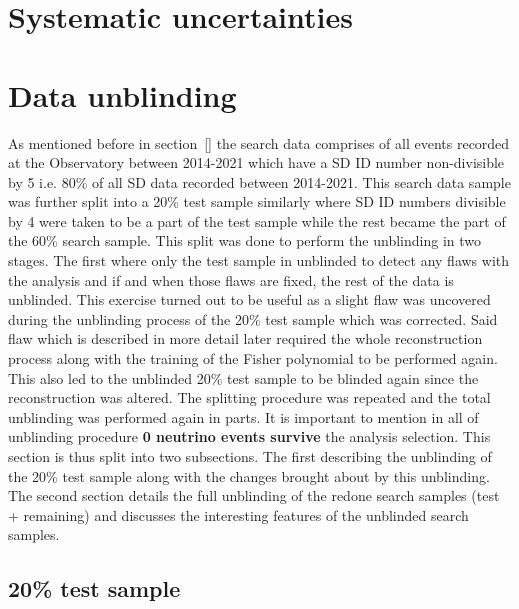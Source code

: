 \section{Systematic uncertainties}
\label{sec:det_uncert}

\section{Data unblinding}
\label{sec:data_unblinding}
As mentioned before in section~\ref{} the search data comprises of all events recorded at the Observatory between 2014-2021 which have a SD ID number non-divisible by 5 i.e. 80\% of all SD data recorded between 2014-2021. This search data sample was further split into a 20\% test sample similarly where SD ID numbers divisible by 4 were taken to be a part of the test sample while the rest became the part of the 60\% search sample. This split was done to perform the unblinding in two stages. The first where only the test sample in unblinded to detect any flaws with the analysis and if and when those flaws are fixed, the rest of the data is unblinded. This exercise turned out to be useful as a slight flaw was uncovered during the unblinding process of the 20\% test sample which was corrected. Said flaw which is described in more detail later required the whole reconstruction process along with the training of the Fisher polynomial to be performed again. This also led to the unblinded 20\% test sample to be blinded again since the reconstruction was altered. The splitting procedure was repeated and the total unblinding was performed again in parts. It is important to mention in all of unblinding procedure \textbf{0 neutrino events survive} the analysis selection.
This section is thus split into two subsections. The first describing the unblinding of the 20\% test sample along with the changes brought about by this unblinding. The second section details the full unblinding of the redone search samples (test + remaining) and discusses the interesting features of the unblinded search samples. 

\subsection{20\% test sample}
\label{subsec:unblind_20}


